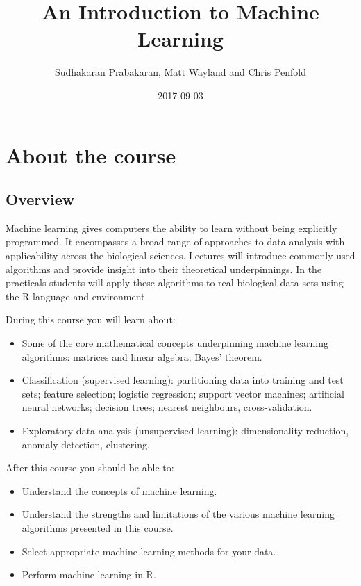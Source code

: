 \documentclass[]{book}
\title{An Introduction to Machine Learning}
\author{Sudhakaran Prabakaran, Matt Wayland and Chris Penfold}
\date{2017-09-03}
\providecommand{\tightlist}{%
  \setlength{\itemsep}{0pt}\setlength{\parskip}{0pt}}
\theoremstyle{definition}
\theoremstyle{definition}
\theoremstyle{definition}
\theoremstyle{remark}
\begin{document}
\maketitle

{
\setcounter{tocdepth}{1}
\tableofcontents
}
\chapter{About the course}\label{about-the-course}

\section{Overview}\label{overview}

Machine learning gives computers the ability to learn without being
explicitly programmed. It encompasses a broad range of approaches to
data analysis with applicability across the biological sciences.
Lectures will introduce commonly used algorithms and provide insight
into their theoretical underpinnings. In the practicals students will
apply these algorithms to real biological data-sets using the R language
and environment.

During this course you will learn about:

\begin{itemize}
\tightlist
\item
  Some of the core mathematical concepts underpinning machine learning
  algorithms: matrices and linear algebra; Bayes' theorem.
\item
  Classification (supervised learning): partitioning data into training
  and test sets; feature selection; logistic regression; support vector
  machines; artificial neural networks; decision trees; nearest
  neighbours, cross-validation.
\item
  Exploratory data analysis (unsupervised learning): dimensionality
  reduction, anomaly detection, clustering.
\end{itemize}

After this course you should be able to:

\begin{itemize}
\tightlist
\item
  Understand the concepts of machine learning.
\item
  Understand the strengths and limitations of the various machine
  learning algorithms presented in this course.
\item
  Select appropriate machine learning methods for your data.
\item
  Perform machine learning in R.
\end{itemize}
\end{document}
